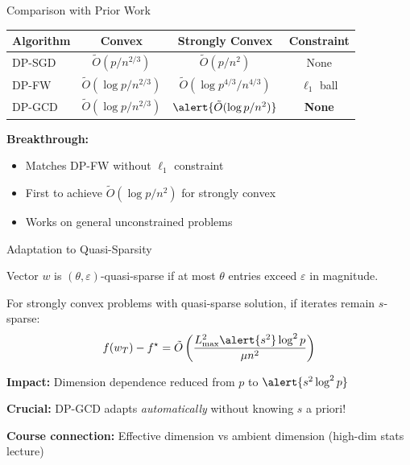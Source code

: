 \documentclass[10pt]{beamer}
\begin{document}
\begin{frame}{Comparison with Prior Work}
\begin{table}
\footnotesize
\begin{tabular}{@{}lccc@{}}
\toprule
\textbf{Algorithm} & \textbf{Convex} & \textbf{Strongly Convex} & \textbf{Constraint} \\
\midrule
DP-SGD & $\tilde{O}(p/n^{2/3})$ & $\tilde{O}(p/n^2)$ & None \\
DP-FW & $\tilde{O}(\log p/n^{2/3})$ & $\tilde{O}(\log p^{4/3}/n^{4/3})$ & $\ell_1$ ball \\
\rowcolor{yellow!30}
DP-GCD & $\tilde{O}(\log p/n^{2/3})$ & $\alert{\tilde{O}(\log p/n^2)}$ & \textbf{None} \\
\bottomrule
\end{tabular}
\end{table}

\vspace{1em}
\textbf{Breakthrough:}
\begin{itemize}
\item Matches DP-FW without $\ell_1$ constraint
\item \alert{First} to achieve $\tilde{O}(\log p / n^2)$ for strongly convex
\item Works on general unconstrained problems
\end{itemize}
\end{frame}

\begin{frame}{Adaptation to Quasi-Sparsity}
\begin{definition}
Vector $w$ is $(\theta, \varepsilon)$-quasi-sparse if at most $\theta$ entries exceed $\varepsilon$ in magnitude.
\end{definition}

\vspace{1em}
\begin{theorem}
For strongly convex problems with quasi-sparse solution, if iterates remain $s$-sparse:
\[
f(w_T) - f^\star = \tilde{O}\left( \frac{L_{\max}^2 \alert{s^2} \log^2 p}{\mu n^2} \right)
\]
\end{theorem}

\vspace{1em}
\textbf{Impact:} Dimension dependence reduced from $p$ to $\alert{s^2 \log^2 p}$

\vspace{0.5em}
\textbf{Crucial:} DP-GCD adapts \emph{automatically} without knowing $s$ a priori!

\vspace{0.3em}
\textbf{Course connection:} Effective dimension vs ambient dimension (high-dim stats lecture)
\end{frame}
\end{document}
